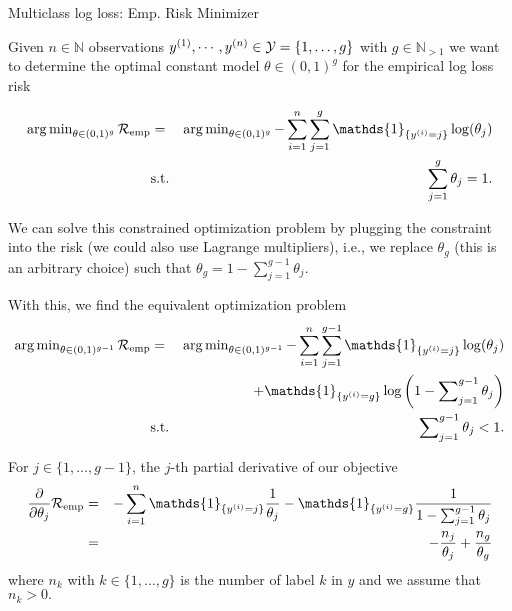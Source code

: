 \documentclass[11pt,compress,t,notes=noshow, xcolor=table]{beamer}
\begin{document}
\begin{vbframe}{Multiclass log loss: Emp. Risk Minimizer}

Given $n \in \mathbb{N}$ observations $y^{(1)}, \cdots, y^{(n)} \in \mathcal{Y} = \{1, \dots, g\}$ with $g\in\mathbb{N}_{>1}$ we want to determine the optimal constant model $\theta \in (0,1)^g$ for the empirical log loss risk

\begin{eqnarray*}
  \argmin_{\theta \in (0, 1)^g}\riske   &=& 
  \argmin_{\theta \in (0, 1)^g}-\sum^n_{i=1}\sum^g_{j=1} \mathds{1}_{\{y^{(i)} = j\}}\log(\theta_j) \\
  &\text{s.t.}& \sum^g_{j=1}\theta_j = 1.
\end{eqnarray*}

We can solve this constrained optimization problem by plugging the constraint into the risk (we could also use Lagrange multipliers), i.e., we replace $\theta_g$ (this is an arbitrary choice) such that $
 \theta_g = 1 - \sum^{g-1}_{j=1}\theta_j.
$

\framebreak 
With this, we find the equivalent optimization problem
\begin{eqnarray*}
  \argmin_{\theta \in (0, 1)^{g-1}}\riske  & = & \argmin_{\theta \in (0, 1)^{g-1}}
  -\sum^n_{i=1}\sum^{g-1}_{j=1} \mathds{1}_{\{y^{(i)} = j\}}\log(\theta_j) \\ 
  &&+ \mathds{1}_{\{y^{(i)} = g\}}\log\left(1 - \sum\nolimits^{g-1}_{j=1}\theta_j\right) \\
  &\text{s.t.}&  \sum\nolimits^{g-1}_{j=1}\theta_j < 1.
\end{eqnarray*}

For $j \in \{1,\dots,g-1\}$, the $j$-th partial derivative of our objective 
\begin{eqnarray*}
 \frac{\partial}{\partial \theta_j}\riske  & = & 
  -\sum^n_{i=1} \mathds{1}_{\{y^{(i)} = j\}}\frac{1}{\theta_j} - \mathds{1}_{\{y^{(i)} = g\}}\frac{1}{1 - \sum^{g-1}_{j=1}\theta_j} \\
  & = & -\frac{n_j}{\theta_j} + \frac{n_g}{\theta_g}
\end{eqnarray*}
where $n_k$ with $k\in \{1,\dots, g\}$ is the number of label $k$ in $y$ and we assume that $n_k > 0.$

\framebreak


\end{vbframe}
\end{document}
